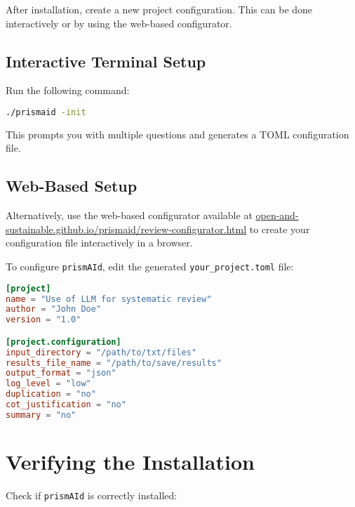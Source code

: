 After installation, create a new project configuration. This can be done interactively or by using the web-based configurator.

\subsection{Interactive Terminal Setup}

\begin{commandbox}
Run the following command:
\begin{lstlisting}[language=Bash]
./prismaid -init
\end{lstlisting}
\end{commandbox}

This prompts you with multiple questions and generates a TOML configuration file.

\subsection{Web-Based Setup}

Alternatively, use the web-based configurator available at \href{https://open-and-sustainable.github.io/prismaid/review-configurator.html}{open-and-sustainable.github.io/prismaid/review-configurator.html} to create your configuration file interactively in a browser.

\begin{configbox}
To configure \texttt{prismAId}, edit the generated \texttt{your\_project.toml} file:
\begin{lstlisting}[language=TOML]
[project]
name = "Use of LLM for systematic review"
author = "John Doe"
version = "1.0"

[project.configuration]
input_directory = "/path/to/txt/files"
results_file_name = "/path/to/save/results"
output_format = "json"
log_level = "low"
duplication = "no"
cot_justification = "no"
summary = "no"
\end{lstlisting}
\end{configbox}

\section{Verifying the Installation}

Check if \texttt{prismAId} is correctly installed:

